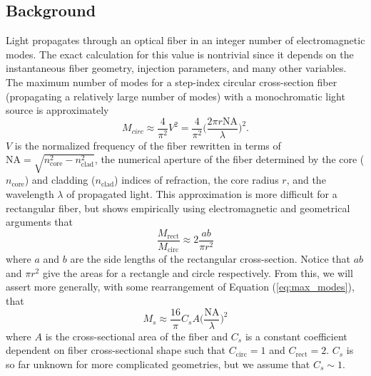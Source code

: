 \documentclass[11pt]{article}
\begin{document}
\subsection{Background}
\label{subsec:modal_noise_intro}

Light propagates through an optical fiber in an integer number of electromagnetic modes. The exact calculation for this value is nontrivial since it depends on the instantaneous fiber geometry, injection parameters, and many other variables. The maximum number of modes for a step-index circular cross-section fiber (propagating a relatively large number of modes) with a monochromatic light source is approximately
\begin{equation}
M_{circ} \approx \frac{4}{\pi ^2} V^2 = \frac{4}{\pi ^2} \Bigg( \frac{2 \pi r \mathrm{NA}}{\lambda} \Bigg) ^2.
\label{eq:max_modes}
\end{equation}
$V$ is the normalized frequency of the fiber rewritten in terms of $\mathrm{NA} = \sqrt{n_\mathrm{core}^2 - n_\mathrm{clad}^2}$, the numerical aperture of the fiber determined by the core ($n_\mathrm{core}$) and cladding ($n_\mathrm{clad}$) indices of refraction, the core radius $r$, and the wavelength $\lambda$ of propagated light. This approximation is more difficult for a rectangular fiber, but \cite{Nikitin2011} shows empirically using electromagnetic and geometrical arguments that
\begin{equation}
\frac{M_\mathrm{rect}}{M_\mathrm{circ}} \approx 2 \frac{ab}{\pi r^2}
\label{eq:prop_modes}
\end{equation}
where $a$ and $b$ are the side lengths of the rectangular cross-section. Notice that $ab$ and $\pi r^2$ give the areas for a rectangle and circle respectively. From this, we will assert more generally, with some rearrangement of Equation (\ref{eq:max_modes}), that
\begin{equation}
M_{s} \approx \frac{16}{\pi} C_{s} A \Bigg( \frac{\mathrm{NA}}{\lambda} \Bigg) ^2
\label{eq:mode_area}
\end{equation}
where $A$ is the cross-sectional area of the fiber and $C_{s}$ is a constant coefficient dependent on fiber cross-sectional shape such that $C_\mathrm{circ} = 1$ and $C_\mathrm{rect} = 2$. $C_{s}$ is so far unknown for more complicated geometries, but we assume that $C_{s} \sim 1$.
\end{document}
